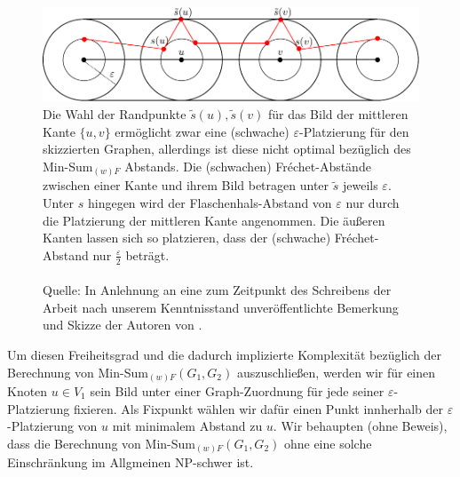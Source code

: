 \documentclass[a4paper, 12pt, twoside]{article}
\theoremstyle{Format1} %
\begin{document}
\begin{figure}[H]
    \centering
    \includegraphics[width=\textwidth]{chapter_3_example_0.pdf}
	\caption{Die Wahl der Randpunkte $\tilde{s}(u), \tilde{s}(v)$ für das Bild der mittleren Kante $\{u,v\}$ ermöglicht zwar eine
	(schwache) $\varepsilon$-Platzierung
	für den skizzierten Graphen, allerdings ist diese nicht optimal bezüglich des Min-Sum$_{(w)F}$ Abstands.
	Die (schwachen) Fréchet-Abstände zwischen einer Kante und ihrem Bild betragen unter $\tilde{s}$ jeweils $\varepsilon$.
	Unter $s$ hingegen wird der Flaschenhals-Abstand von $\varepsilon$ nur durch die Platzierung der mittleren Kante angenommen.
	Die äußeren Kanten lassen sich so platzieren, dass der (schwache) Fréchet-Abstand nur $\frac{\varepsilon}{2}$ beträgt.
	\\
	\\
	Quelle: In Anlehnung an eine zum Zeitpunkt des Schreibens der Arbeit nach unserem Kenntnisstand unveröffentlichte Bemerkung und Skizze der Autoren von \cite{Buchin}.
	}
    \label{chapter_3_example_0}
\end{figure}

Um diesen Freiheitsgrad und die dadurch implizierte Komplexität bezüglich der Berechnung von Min-Sum$_{(w)F}(G_1,G_2)$ auszuschließen,
werden wir für einen Knoten $u \in V_1$ sein Bild unter einer Graph-Zuordnung für jede seiner $\varepsilon$-Platzierung fixieren.
Als Fixpunkt wählen wir dafür einen Punkt innherhalb der $\varepsilon$-Platzierung von $u$ mit minimalem Abstand zu $u$.
Wir behaupten (ohne Beweis), dass die Berechnung von Min-Sum$_{(w)F}(G_1,G_2)$ ohne eine solche Einschränkung im Allgmeinen NP-schwer ist.
\end{document}

